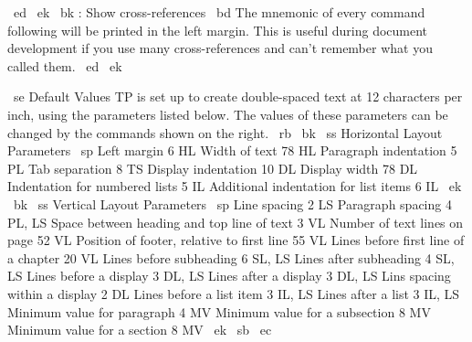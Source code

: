 ~ed ~ek ~bk \ZR: Show cross-references
~bd The mnemonic of every \MR command following \ZR will be printed
in the left margin.
This is useful during document development if you use many cross-references
and can't remember what you called them.
~ed ~ek

~se Default Values
TP is set up to create double-spaced text at 12 characters per inch,
using the parameters listed below.
The values of these parameters can be changed by the commands shown on 
the right.
~rb ~bk ~ss Horizontal Layout Parameters
~sp
Left margin                                   6    HL
Width of text                                78    HL
Paragraph indentation                         5    PL
Tab separation                                8    TS
Display indentation                          10    DL
Display width                                78    DL
Indentation for numbered lists                5    IL
Additional indentation for list items         6    IL
~ek
~bk ~ss Vertical Layout Parameters
~sp
Line spacing                                  2    LS
Paragraph spacing                             4    PL, LS
Space between heading and top line of text    3    VL
Number of text lines on page                 52    VL
Position of footer, relative to first line   55    VL
Lines before first line of a chapter         20    VL
Lines before subheading                       6    SL, LS
Lines after subheading                        4    SL, LS
Lines before a display                        3    DL, LS
Lines after a display                         3    DL, LS
Lins spacing within a display                 2    DL
Lines before a list item                      3    IL, LS
Lines after a list                            3    IL, LS
Minimum value for paragraph                   4    MV
Minimum value for a subsection                8    MV
Minimum value for a section                   8    MV
~ek ~sb ~ec \
